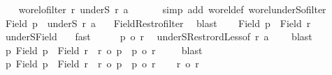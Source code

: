 \begin{isabellebody}
\ \ \isamarkupfalse%
\ {\isachardoublequoteopen}wo{\isacharunderscore}{\kern0pt}rel{\isachardot}{\kern0pt}ofilter\ r\ {\isacharparenleft}{\kern0pt}underS\ r\ a{\isacharparenright}{\kern0pt}{\isachardoublequoteclose}\ \isamarkupfalse%
\ {}\isanewline
\ \ \isamarkupfalse%
\ {\isacharparenleft}{\kern0pt}simp\ add{\isacharcolon}{\kern0pt}\ wo{\isacharunderscore}{\kern0pt}rel{\isacharunderscore}{\kern0pt}def\ wo{\isacharunderscore}{\kern0pt}rel{\isachardot}{\kern0pt}underS{\isacharunderscore}{\kern0pt}ofilter{\isacharparenright}{\kern0pt}\isanewline
\ \ \isamarkupfalse%
\ {\isachardoublequoteopen}Field\ {\isacharquery}{\kern0pt}p\ {\isacharequal}{\kern0pt}\ underS\ r\ a{\isachardoublequoteclose}\ \isamarkupfalse%
\ {}\ Field{\isacharunderscore}{\kern0pt}Restr{\isacharunderscore}{\kern0pt}ofilter\ \isamarkupfalse%
\ blast\isanewline
\ \ \isamarkupfalse%
\ {\isachardoublequoteopen}Field\ {\isacharquery}{\kern0pt}p\ {\isacharless}{\kern0pt}\ Field\ r{\isachardoublequoteclose}\ \isamarkupfalse%
\ underS{\isacharunderscore}{\kern0pt}Field{}\ {}\ \isamarkupfalse%
\ fast\isanewline
\ \ \isamarkupfalse%
\ \isamarkupfalse%
\ {\isachardoublequoteopen}{\isacharquery}{\kern0pt}p\ {\isacharless}{\kern0pt}o\ r{\isachardoublequoteclose}\ \isamarkupfalse%
\ underS{\isacharunderscore}{\kern0pt}Restr{\isacharunderscore}{\kern0pt}ordLess{\isacharbrackleft}{\kern0pt}of\ r\ a{\isacharbrackright}{\kern0pt}\ {}\ {}\ \isamarkupfalse%
\ blast\isanewline
\ \ \isamarkupfalse%
\isanewline
\ \ \isamarkupfalse%
\ {\isachardoublequoteopen}{\isasymexists}p{\isachardot}{\kern0pt}\ Field\ p\ {\isacharless}{\kern0pt}\ Field\ r\ {\isasymand}\ r{\isacharprime}{\kern0pt}\ {\isacharequal}{\kern0pt}o\ p\ {\isasymand}\ p\ {\isacharless}{\kern0pt}o\ r{\isachardoublequoteclose}\ \isamarkupfalse%
\ {}\ \isamarkupfalse%
\ blast\isanewline
{}\isamarkupfalse%
\isanewline
\ \ \isamarkupfalse%
\ {\isachardoublequoteopen}{\isasymexists}p{\isachardot}{\kern0pt}\ Field\ p\ {\isacharless}{\kern0pt}\ Field\ r\ {\isasymand}\ r{\isacharprime}{\kern0pt}\ {\isacharequal}{\kern0pt}o\ p\ {\isasymand}\ p\ {\isacharless}{\kern0pt}o\ r{\isachardoublequoteclose}\isanewline
\ \ \isamarkupfalse%
\ {\isachardoublequoteopen}r{\isacharprime}{\kern0pt}\ {\isacharless}{\kern0pt}o\ r{\isachardoublequoteclose}\ \isamarkupfalse%

\end{isabellebody}
